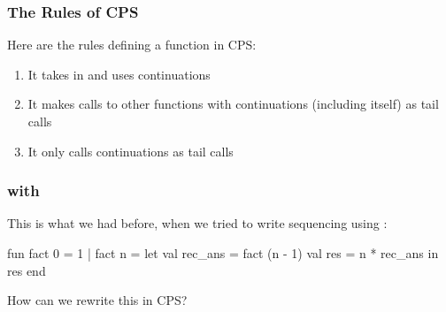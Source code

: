\documentclass[aspectratio=169, handout]{beamer}
\begin{document}
\begin{frame}[fragile]
  \frametitle{The Rules of CPS}

  Here are the rules defining a function in CPS:

  \pause
  \vspace{\fill}


  \pause
  \vspace{\fill}

  \begin{enumerate}
    \item It takes in and uses continuations \pause
    \item It makes calls to other functions with continuations (including itself)
    as tail calls \pause
    \item It only calls continuations as tail calls 
  \end{enumerate}

  \pause
  \vspace{\fill}

\end{frame}





\begin{frame}[fragile]
  \frametitle{ with }

  This is what we had before, when we tried to write sequencing using :

  \pause
  \vspace{\fill}

  \begin{codeblock}
    fun fact 0 = 1
      | fact n = 
        let 
          val rec_ans = fact (n - 1) 
          val res = n * rec_ans
        in
          res
        end
  \end{codeblock}

  \pause
  \vspace{\fill}

  How can we rewrite this in CPS?
\end{frame}
\end{document}
